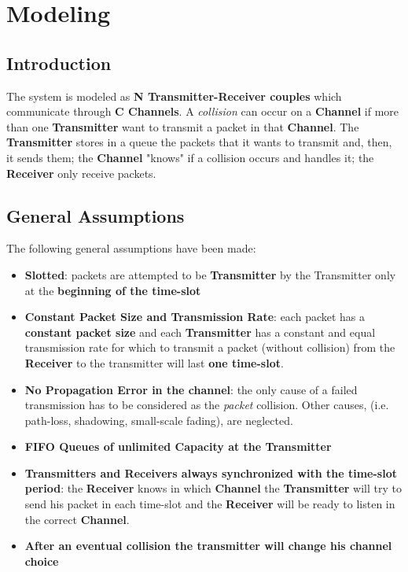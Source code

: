 \section{Modeling}
\subsection{Introduction}
The system is modeled as \textbf{N Transmitter-Receiver couples} which communicate through \textbf{C Channels}. A \textit{collision} can occur on a \textbf{Channel} if more than one \textbf{Transmitter} want to transmit a packet in that \textbf{Channel}. The \textbf{Transmitter} stores in a queue the packets that it wants to transmit and, then, it sends them; the \textbf{Channel} "knows" if a collision occurs and handles it; the \textbf{Receiver} only receive packets.  
\subsection{General Assumptions}
The following general assumptions have been made:
\begin{itemize}
	\item \textbf{Slotted}: packets are attempted to be \textbf{Transmitter} by the Transmitter only at the \textbf{beginning of the time-slot}
	\item \textbf{Constant Packet Size and Transmission Rate}: each packet has a \textbf{constant packet size} and each \textbf{Transmitter} has a constant and equal transmission rate for which to transmit a packet (without collision) from the \textbf{Receiver} to the transmitter will last \textbf{one time-slot}.
	\item \textbf{No Propagation Error in the channel}: the only cause of a failed transmission has to be considered as the \textit{packet} collision. Other causes, (i.e. path-loss, shadowing, small-scale fading), are neglected. 
	\item \textbf{FIFO Queues of unlimited Capacity at the Transmitter} 
	\item \textbf{Transmitters and Receivers always synchronized with the time-slot period}: the \textbf{Receiver} knows in which \textbf{Channel} the \textbf{Transmitter} will try to send his packet in each time-slot and the \textbf{Receiver} will be ready to listen in the correct \textbf{Channel}.
	\item \textbf{After an eventual collision the transmitter will change his channel choice}
\end{itemize}

